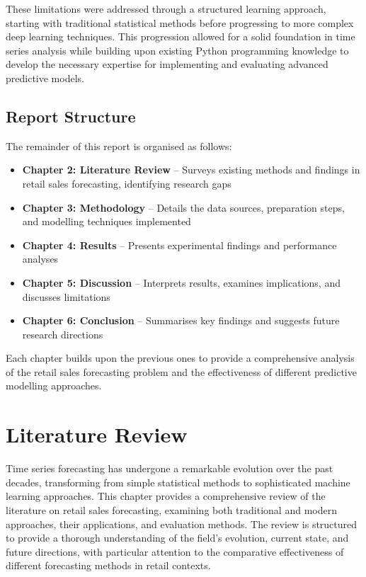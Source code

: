 \documentclass[12pt,a4paper]{report}
\begin{document}
These limitations were addressed through a structured learning approach, starting with traditional statistical methods before progressing to more complex deep learning techniques. This progression allowed for a solid foundation in time series analysis while building upon existing Python programming knowledge to develop the necessary expertise for implementing and evaluating advanced predictive models.

\section{Report Structure}

The remainder of this report is organised as follows:

\begin{itemize}
    \item \textbf{Chapter 2: Literature Review} -- Surveys existing methods and findings in retail sales forecasting, identifying research gaps
    \item \textbf{Chapter 3: Methodology} -- Details the data sources, preparation steps, and modelling techniques implemented
    \item \textbf{Chapter 4: Results} -- Presents experimental findings and performance analyses
    \item \textbf{Chapter 5: Discussion} -- Interprets results, examines implications, and discusses limitations
    \item \textbf{Chapter 6: Conclusion} -- Summarises key findings and suggests future research directions
\end{itemize}

Each chapter builds upon the previous ones to provide a comprehensive analysis of the retail sales forecasting problem and the effectiveness of different predictive modelling approaches.

\chapter{Literature Review}

Time series forecasting has undergone a remarkable evolution over the past decades, transforming from simple statistical methods to sophisticated machine learning approaches. This chapter provides a comprehensive review of the literature on retail sales forecasting, examining both traditional and modern approaches, their applications, and evaluation methods. The review is structured to provide a thorough understanding of the field's evolution, current state, and future directions, with particular attention to the comparative effectiveness of different forecasting methods in retail contexts.
\end{document}
